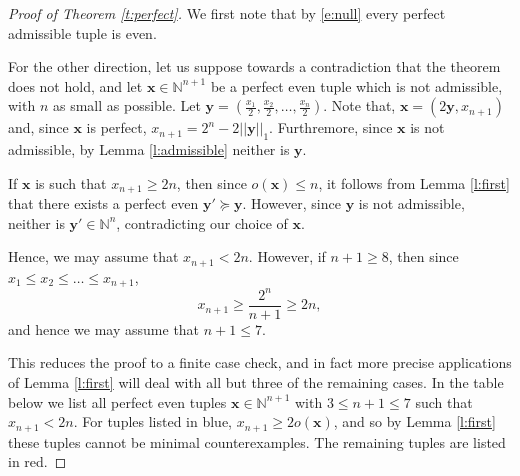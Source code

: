 \documentclass[10pt,a4paper]{amsart}
\begin{document}
\begin{proof}[Proof of Theorem \ref{t:perfect}]
We first note that by \eqref{e:null} every perfect admissible tuple is even.

For the other direction, let us suppose towards a contradiction that the theorem does not hold, and let $\bm{x} \in \mathbb{N}^{n+1}$ be a perfect even tuple which is not admissible, with $n$ as small as possible. Let $\bm{y} = \left(\frac{x_1}{2},\frac{x_2}{2},\ldots, \frac{x_n}{2}\right)$. Note that, $\bm{x} = (2\bm{y},x_{n+1})$ and, since $\bm{x}$ is perfect, $x_{n+1} = 2^n - 2||\bm{y}||_1$. Furthremore, since $\bm{x}$ is not admissible, by Lemma \ref{l:admissible} neither is $\bm{y}$.

If $\bm{x}$ is such that $x_{n+1} \geq 2n$, then since $o(\bm{x}) \leq n$, it follows from Lemma \ref{l:first} that there exists a perfect even $\bm{y'} \succeq \bm{y}$. However, since $\bm{y}$ is not admissible, neither is $\bm{y'} \in \mathbb{N}^n$, contradicting our choice of $\bm{x}$.

Hence, we may assume that $x_{n+1} < 2n$. However, if $n+1 \geq 8$, then since $x_1\leq x_2 \leq \ldots \leq x_{n+1}$,
\begin{equation} \label{e:dim}
x_{n+1} \geq \frac{2^n}{n+1} \geq 2n,
\end{equation}
and hence we may assume that $n+1 \leq 7$.

This reduces the proof to a finite case check, and in fact more precise applications of Lemma \ref{l:first} will deal with all but three of the remaining cases. In the table below we list all perfect even tuples $\bm{x} \in \mathbb{N}^{n+1}$ with $3\leq n+1 \leq 7$ such that $x_{n+1} < 2n$. For tuples listed in blue, $x_{n+1} \geq 2o(\bm{x})$, and so by Lemma \ref{l:first} these tuples cannot be minimal counterexamples. The remaining tuples are listed in red.


\end{proof}
\end{document}
